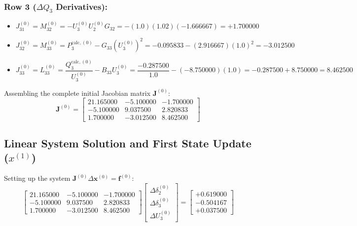 \documentclass[12pt,a4paper,oneside]{report}
\begin{document}
\subsubsection{Row 3 ($\Delta Q_3$ Derivatives):}
\begin{itemize}
    \item $J_{31}^{(0)} = M_{32}^{(0)} = -U_3^{(0)} U_2^{(0)} G_{32} = -(1.0)(1.02)(-1.666667) = +1.700000$
    \item $J_{32}^{(0)} = M_{33}^{(0)} = P_3^{\text{calc},(0)} - G_{33} (U_3^{(0)})^2 = -0.095833 - (2.916667)(1.0)^2 = -3.012500$
    \item $J_{33}^{(0)} = L_{33}^{(0)} = \dfrac{Q_3^{\text{calc},(0)}}{U_3^{(0)}} - B_{33} U_3^{(0)} = \dfrac{-0.287500}{1.0} - (-8.750000)(1.0) = -0.287500 + 8.750000 = 8.462500$
\end{itemize}

Assembling the complete initial Jacobian matrix $\mathbf{J}^{(0)}$:
\begin{equation}
\mathbf{J}^{(0)} = \begin{bmatrix}
21.165000 & -5.100000 & -1.700000 \\
-5.100000 & 9.037500 & 2.820833 \\
1.700000 & -3.012500 & 8.462500
\end{bmatrix}
\end{equation}

\subsection{Linear System Solution and First State Update ($x^{(1)}$)}
Setting up the system $\mathbf{J}^{(0)} \Delta \mathbf{x}^{(0)} = \mathbf{f}^{(0)}$:
\begin{equation}
\begin{bmatrix}
21.165000 & -5.100000 & -1.700000 \\
-5.100000 & 9.037500 & 2.820833 \\
1.700000 & -3.012500 & 8.462500
\end{bmatrix}
\begin{bmatrix}
\Delta \delta_2^{(0)} \\
\Delta \delta_3^{(0)} \\
\Delta U_3^{(0)}
\end{bmatrix}
=
\begin{bmatrix}
+0.619000 \\
-0.504167 \\
+0.037500
\end{bmatrix}
\end{equation}
\end{document}
